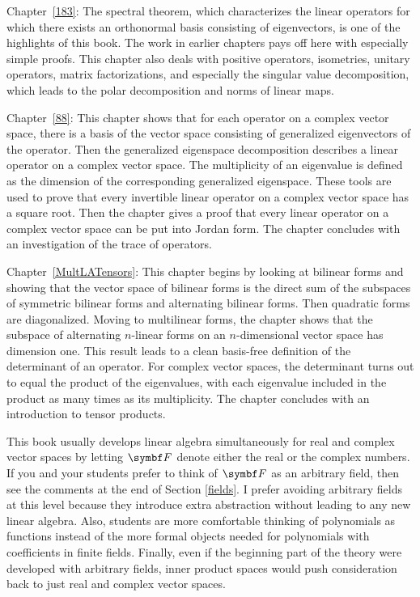 \begin{Itemize}
\item
Chapter~\ref{183}: The spectral theorem, which characterizes the linear operators for which there exists an orthonormal basis consisting of eigenvectors, is one of the highlights of this book.  The work in earlier chapters pays off here with especially simple proofs.  This chapter also deals with positive operators, isometries, unitary operators, matrix factorizations, and especially the singular value decomposition, which leads to the polar decomposition and norms of linear maps.

\item
Chapter~\ref{88}: This chapter shows that for each operator on a complex vector space, there is a basis of the vector space consisting of generalized eigenvectors of the operator. Then the generalized eigenspace decomposition describes a linear operator on  a complex vector space. The multiplicity of an eigenvalue is defined as the dimension of the corresponding generalized eigenspace. These tools are used to prove that every invertible linear operator on a complex vector space has a square root. Then the chapter gives a proof that every linear operator on a complex vector space can be put into Jordan form. The chapter concludes with an investigation of the trace of operators.

\item
Chapter~\ref{MultLATensors}: This chapter begins by looking at bilinear forms and showing that the vector space of bilinear forms is the direct sum of the subspaces of symmetric bilinear forms and alternating bilinear forms. Then quadratic forms are diagonalized. Moving to multilinear forms, the chapter shows that the subspace of alternating $n$-linear forms on an $n$-dimensional vector space has dimension one. This result leads to a clean basis-free definition of the determinant of an operator. For complex vector spaces, the determinant turns out to equal the product of the eigenvalues, with each eigenvalue included in the product as many times as its multiplicity. The chapter concludes with an introduction to tensor products.

\end{Itemize}

This book usually develops linear algebra simultaneously for real and
complex vector spaces by letting $\F{}$ denote either the real or the
complex numbers. If you and your students prefer to think of $\F{}$ as an arbitrary field, then see the comments at the end of Section \ref{fields}. I prefer avoiding arbitrary fields at this level because they  introduce extra abstraction without leading to any new linear
algebra.  Also, students are more comfortable thinking of polynomials as
functions instead of the more formal objects needed for polynomials
with coefficients in finite fields.  Finally, even if the beginning
part of the theory were developed with arbitrary fields, inner product
spaces would push consideration back to just real and complex vector
spaces.

